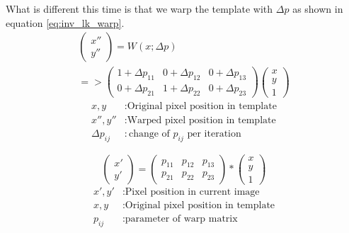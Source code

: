\documentclass[11pt,a4paper,titlepage,oneside]{report}
\begin{document}
What is different this time is that we warp the template with $\Delta p$ as shown in equation \ref{eq:inv_lk_warp}. 
\begin{equation}\label{eq:inv_lk_warp}
	\begin{gathered}
		\begin{pmatrix}
			x'' \\
			y''
		\end{pmatrix}=
		W(x;\Delta p)\\
		=>\begin{pmatrix}
			1 + \Delta p_{11} & 0 + \Delta p_{12} & 0 + \Delta p_{13} \\
			0 + \Delta p_{21} & 1 + \Delta p_{22} & 0 + \Delta p_{23}
		\end{pmatrix}
		\begin{pmatrix}
			x\\
			y\\
			1
		\end{pmatrix}
	\end{gathered}
\end{equation}
\begin{align*}
	x,y						&:	\text{Original pixel position in template}\\
	x'',y''				&:	\text{Warped pixel position in template}\\
	\Delta p_{ij}	&:	\text{change of $p_{ij}$ per iteration}
\end{align*}

\begin{equation}
	\begin{pmatrix}
		x' \\
		y'
	\end{pmatrix}=
	\begin{pmatrix}
		p_{11} & p_{12} & p_{13} \\
		p_{21} & p_{22} & p_{23}
	\end{pmatrix}*
	\begin{pmatrix}
		x\\
		y\\
		1
	\end{pmatrix}
\end{equation}
\begin{align*}
	x',y'					&:	\text{Pixel position in current image}\\
	x,y						&:	\text{Original pixel position in template}\\
	p_{ij}				&:	\text{parameter of warp matrix}\\
\end{align*}
\end{document}
